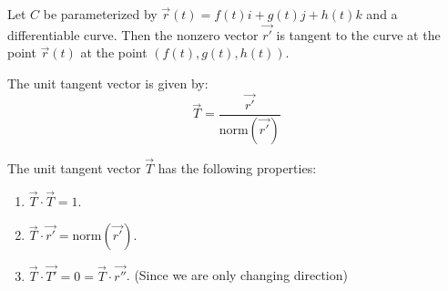 \documentclass[11pt]{report}
\begin{document}
\begin{definition}
    Let $C$ be parameterized by $\vec{r}(t) = f(t)i + g(t)j + h(t)k$ and a differentiable curve. Then the nonzero vector $\vec{r'}$ is tangent to the curve at the point $\vec{r}(t)$ at the point $(f(t), g(t), h(t))$.
\end{definition}
\begin{definition}
    The unit tangent vector is given by:
    \begin{equation}
        \vec{T} = \frac{\vec{r'}}{\text{norm}({\vec{r'}})}
    \end{equation}
\end{definition}
\begin{theorem}
    The unit tangent vector $\vec{T}$ has the following properties:
    \begin{enumerate}
        \item $\vec{T} \cdot \vec{T} = 1$.
        \item $\vec{T} \cdot \vec{r'} = \text{norm}({\vec{r'}})$.
        \item $\vec{T} \cdot \vec{T'} = 0 = \vec{T} \cdot \vec{r''}$. (Since we are only changing direction)
    \end{enumerate}
\end{theorem}
\end{document}
